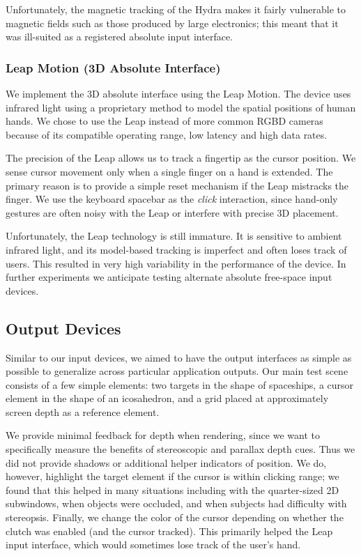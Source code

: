 Unfortunately, the magnetic tracking of the Hydra makes it fairly vulnerable to
magnetic fields such as those produced by large electronics; this meant that it
was ill-suited as a registered absolute input interface.

\subsubsection{Leap Motion (3D Absolute Interface)}
We implement the 3D absolute interface using the Leap Motion. The device uses
infrared light using a proprietary method to model the spatial positions of
human hands. We chose to use the Leap instead of more common
RGBD cameras because of its compatible operating range, low latency and high
data rates.

The precision of the Leap allows us to track a fingertip as the cursor position.
We sense cursor movement only when a single finger on a hand is extended. The
primary reason is to provide a simple reset mechanism if the Leap mistracks the
finger. We use the keyboard spacebar as the {\it click} interaction, since
hand-only gestures are often noisy with the Leap or interfere with precise 3D
placement.

Unfortunately, the Leap technology is still immature. It is sensitive to ambient
infrared light, and its model-based tracking is imperfect and often loses track
of users. This resulted in very high variability in the performance of the
device. In further experiments we anticipate testing alternate absolute
free-space input devices.

\subsection{Output Devices}
Similar to our input devices, we aimed to have the output interfaces as simple
as possible to generalize across particular application outputs. Our main test
scene consists of a few simple elements: two targets in the shape of spaceships,
a cursor element in the shape of an icosahedron, and a grid placed at
approximately screen depth as a reference element.

We provide minimal feedback for depth when rendering, since we want to
specifically measure the benefits of stereoscopic and parallax depth cues. Thus
we did not provide shadows or additional helper indicators of position. We do,
however, highlight the target element if the cursor is within clicking range;
we found that this helped in many situations including with the quarter-sized 2D
subwindows, when objects were occluded, and when subjects had difficulty with
stereopsis. Finally, we change the color of the cursor depending on whether the
clutch was enabled (and the cursor tracked). This primarily helped the Leap
input interface, which would sometimes lose track of the user's hand.

